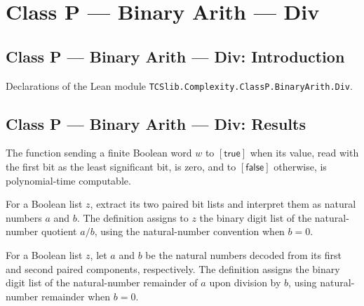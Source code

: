 \section{Class P --- Binary Arith --- Div}
\subsection*{Class P --- Binary Arith --- Div: Introduction}

Declarations of the Lean module \texttt{TCSlib.Complexity.ClassP.BinaryArith.Div}.

\subsection*{Class P --- Binary Arith --- Div: Results}

\begin{theorem}
\label{Complexity.BinArith.polyTimeComputable_isZero}
\leanok
{}
The function sending a finite Boolean word $w$ to $[\mathsf{true}]$ when its value, read
with the first bit as the least significant bit, is zero, and to $[\mathsf{false}]$
otherwise, is polynomial-time computable.
\end{theorem}

\begin{definition}
\label{Complexity.BinArith.div}
\leanok
{}
For a Boolean list $z$, extract its two paired bit lists and interpret them as natural
numbers $a$ and $b$. The definition assigns to $z$ the binary digit list of the
natural-number quotient $a/b$, using the natural-number convention when $b=0$.
\end{definition}

\begin{definition}
\label{Complexity.BinArith.mod}
\leanok
{}
For a Boolean list $z$, let $a$ and $b$ be the natural numbers decoded from its first
and second paired components, respectively. The definition assigns the binary digit list
of the natural-number remainder of $a$ upon division by $b$, using natural-number
remainder when $b=0$.
\end{definition}

